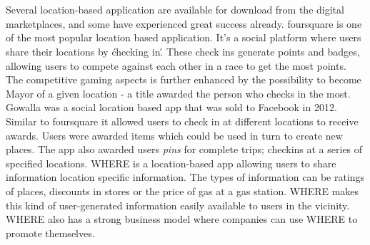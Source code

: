 \\\\
Several location-based application are available for download from the digital marketplaces, and some have experienced great success already. foursquare is one of the most popular location based application. It's a social platform where users share their locations by \'checking in\'. These check ins generate points and badges, allowing users to compete against each other in a race to get the most points. The competitive gaming aspects is further enhanced by the possibility to become Mayor of a given location - a title awarded the person who checks in the most. Gowalla was a social location based app that was sold to Facebook in 2012. Similar to foursquare it allowed users to check in at different locations to receive awards. Users were awarded items which could be used in turn to create new places. The app also awarded users \emph{pins} for complete trips; checkins at a series of specified locations. WHERE is a location-based app allowing users to share information location specific information. The types of information can be ratings of places, discounts in stores or the price of gas at a gas station. WHERE makes this kind of user-generated information easily available to users in the vicinity. WHERE also has a strong business model where companies can use WHERE to promote themselves. 

